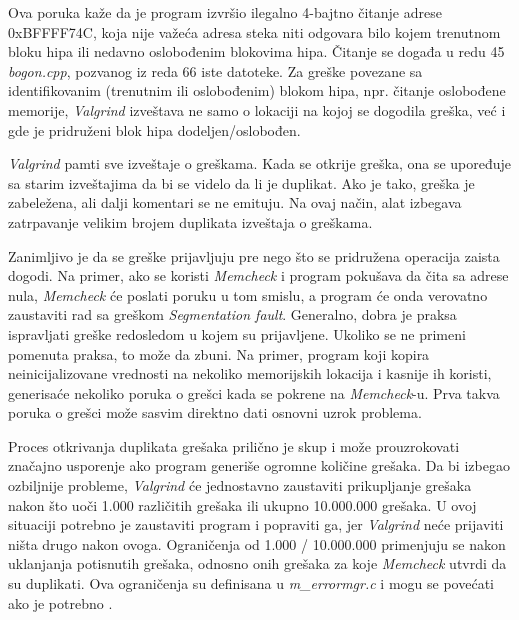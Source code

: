 \documentclass[12pt,oneside]{memoir}
\theoremstyle{plain}
\theoremstyle{definition}
\begin{document}
Ova poruka kaže da je program izvršio ilegalno 4-bajtno čitanje adrese 0xBFFFF74C, koja nije važeća adresa steka niti odgovara bilo kojem trenutnom bloku hipa ili nedavno oslobođenim blokovima hipa. Čitanje se događa u redu 45 \textit{bogon.cpp}, pozvanog iz reda 66 iste datoteke. Za greške povezane sa identifikovanim (trenutnim ili oslobođenim) blokom hipa, npr. čitanje oslobođene memorije, \textit{Valgrind} izveštava ne samo o lokaciji na kojoj se dogodila greška, već i gde je pridruženi blok hipa dodeljen/oslobođen.

\textit{Valgrind} pamti sve izveštaje o greškama. Kada se otkrije greška, ona se upoređuje sa starim izveštajima da bi se videlo da li je duplikat. Ako je tako, greška je zabeležena, ali dalji komentari se ne emituju. Na ovaj način, alat izbegava zatrpavanje velikim brojem duplikata izveštaja o greškama.  

Zanimljivo je da se greške prijavljuju pre nego što se pridružena operacija zaista dogodi. Na primer, ako se koristi \textit{Memcheck} i program pokušava da čita sa adrese nula, \textit{Memcheck} će poslati poruku u tom smislu, a program će onda verovatno zaustaviti rad sa greškom \textit{Segmentation fault}. Generalno, dobra je praksa ispravljati greške redosledom u kojem su prijavljene. Ukoliko se ne primeni pomenuta praksa, to može da zbuni. Na primer, program koji kopira neinicijalizovane vrednosti na nekoliko memorijskih lokacija i kasnije ih koristi, generisaće nekoliko poruka o grešci kada se pokrene na \textit{Memcheck}-u. Prva takva poruka o grešci može sasvim direktno dati osnovni uzrok problema. 

Proces otkrivanja duplikata grešaka prilično je skup i može prouzrokovati značajno usporenje ako program generiše ogromne količine grešaka. Da bi izbegao ozbiljnije probleme, \textit{Valgrind} će jednostavno zaustaviti prikupljanje grešaka nakon što uoči 1.000 različitih grešaka ili ukupno 10.000.000 grešaka. U ovoj situaciji potrebno je zaustaviti program i popraviti ga, jer \textit{Valgrind} neće prijaviti ništa drugo nakon ovoga. Ograničenja od 1.000 / 10.000.000 primenjuju se nakon uklanjanja potisnutih grešaka, odnosno onih grešaka za koje \textit{Memcheck} utvrdi da su duplikati. Ova ograničenja su definisana u \textit{m\_errormgr.c} i mogu se povećati ako je potrebno \cite{ValgrindCore}. 
\end{document}
